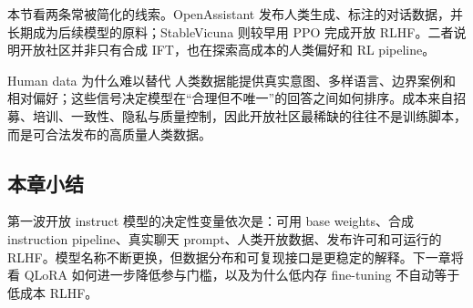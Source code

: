 本节看两条常被简化的线索。OpenAssistant 发布人类生成、标注的对话数据，并长期成为后续模型的原料；StableVicuna 则较早用 PPO 完成开放 RLHF。二者说明开放社区并非只有合成 IFT，也在探索高成本的人类偏好和 RL pipeline。



\begin{importantbox}{Human data 为什么难以替代}
人类数据能提供真实意图、多样语言、边界案例和相对偏好；这些信号决定模型在“合理但不唯一”的回答之间如何排序。成本来自招募、培训、一致性、隐私与质量控制，因此开放社区最稀缺的往往不是训练脚本，而是可合法发布的高质量人类数据。
\end{importantbox}


\subsection{本章小结}

第一波开放 instruct 模型的决定性变量依次是：可用 base weights、合成 instruction pipeline、真实聊天 prompt、人类开放数据、发布许可和可运行的 RLHF。模型名称不断更换，但数据分布和可复现接口是更稳定的解释。下一章将看 QLoRA 如何进一步降低参与门槛，以及为什么低内存 fine-tuning 不自动等于低成本 RLHF。

